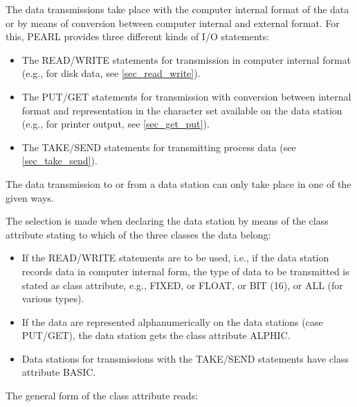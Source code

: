 The data transmissions take place with the computer internal format of
the data or by means of conversion between computer internal and
external format. For this, PEARL provides three different kinds of I/O
statements:
\begin{itemize}
\item The READ/WRITE statements for transmission in computer internal
format (e.g., for disk data, see \ref{sec_read_write}).
\item The PUT/GET statements for transmission with conversion between
internal format and representation in the character set available on the
data station (e.g., for printer output, see \ref{sec_get_put}).
\item The TAKE/SEND statements for transmitting process data (see
\ref{sec_take_send}).
\end{itemize}

The data transmission to or from a data station can only take place in
one of the given ways.

The selection is made when declaring the data station by means of the
class attribute stating to which of the three classes the data belong:
\begin{itemize}
\item If the READ/WRITE statements are to be used, i.e., if the data
station records data in computer internal form, the type of data to be
transmitted is stated as class attribute, e.g., FIXED, or FLOAT, %
or BIT (16), or ALL (for various types).
\item If the data are represented alphanumerically on the data stations
(case PUT/GET), the data station gets the class attribute ALPHIC.
\item Data stations for transmissions with the TAKE/SEND statements
have class attribute BASIC.
\end{itemize}

The general form of the class attribute reads:













